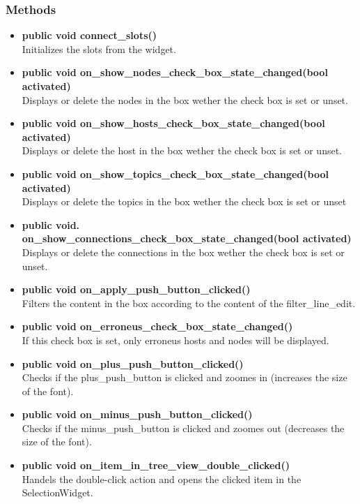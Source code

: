 \subsubsection{Methods}
\begin{itemize}
  \item \textbf{public void connect\_slots()}\\
  Initializes the slots from the widget.
  \item \textbf{public void on\_show\_nodes\_check\_box\_state\_changed(bool activated)}\\
  Displays or delete the nodes in the box wether the check box is set or unset.
  \item \textbf{public void on\_show\_hosts\_check\_box\_state\_changed(bool activated)}\\
  Displays or delete the host in the box wether the check box is set or unset.
  \item \textbf{public void on\_show\_topics\_check\_box\_state\_changed(bool activated)}\\
  Displays or delete the topics in the box wether the check box is set or unset
  \item \textbf{public void.
  on\_show\_connections\_check\_box\_state\_changed(bool activated)}\\
  Displays or delete the connections in the box wether the check box is set or
  unset.
  \item \textbf{public void on\_apply\_push\_button\_clicked()}\\
  Filters the content in the box according to the content of the
  filter\_line\_edit.
  \item \textbf{public void on\_erroneus\_check\_box\_state\_changed()}\\
  If this check box is set, only erroneus hosts and nodes will be displayed.  
  \item \textbf{public void on\_plus\_push\_button\_clicked()}\\
  Checks if the plus\_push\_button is clicked and zoomes in (increases the size
  of the font).
  \item \textbf{public void on\_minus\_push\_button\_clicked()}\\
  Checks if the minus\_push\_button is clicked and zoomes out (decreases the
  size of the font).
  \item \textbf{public void on\_item\_in\_tree\_view\_double\_clicked()}\\
  Handels the double-click action and opens the clicked item in the SelectionWidget.
\end{itemize}

